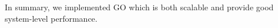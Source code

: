 
In summary, we implemented GO which is both scalable and provide good system-level performance.

% 
% 
% 
% 
% 
% 
% 
% 
% 


